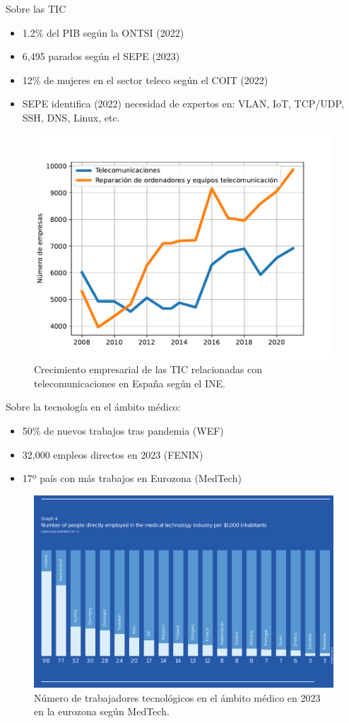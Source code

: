 \documentclass[xcolor=table,xcolor=x11names]{beamer}
\begin{document}
\begin{frame}{\subsecname}

    Sobre las TIC
    \begin{itemize}
        \item 1.2\% del PIB según la ONTSI (2022)
        \item 6,495 parados según el SEPE (2023)
        \item 12\% de mujeres en el sector teleco
            según el COIT (2022)
        \item SEPE identifica (2022) necesidad de
            expertos en: VLAN, IoT, TCP/UDP, SSH, DNS, Linux, etc.
    \end{itemize}

\begin{figure}[t]
    \centering
    \includegraphics[width=.4\textwidth]{figures/crecimiento-tic-ine}
    \caption{Crecimiento empresarial de las TIC relacionadas con
    telecomunicaciones en España según el INE.}
    \label{fig:empresas-telco-ine}
\end{figure}

\end{frame}




\begin{frame}{\subsecname}
    Sobre la tecnología en el ámbito médico:
    \begin{itemize}
        \item 50\% de nuevos trabajos tras pandemia (WEF)
        \item 32,000 empleos directos en 2023 (FENIN)
        \item 17º país con más trabajos en Eurozona (MedTech)
    \end{itemize}
\begin{figure}[t]
    \centering
    \includegraphics[width=.6\textwidth]{figures/medtech-europe--facts-figures-2024}
    \caption{Número de trabajadores tecnológicos en el
    ámbito médico en 2023 en la eurozona según
    MedTech.}
    \label{fig:medtech}
\end{figure}
\end{frame}
\end{document}
